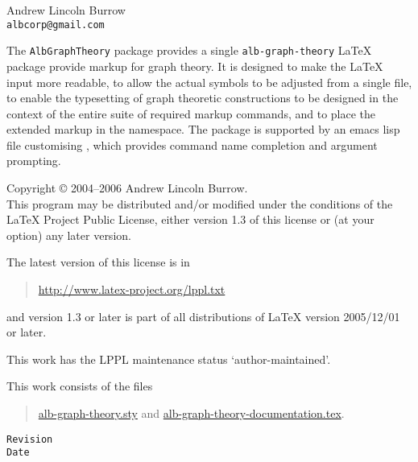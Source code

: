\documentclass[11pt,a4paper,oneside,titlepage]{alb-corp}
\begin{document}


\begin{albTitlePage}


  Andrew Lincoln Burrow\\
  \texttt{albcorp@gmail.com}



  The \texttt{AlbGraphTheory} package provides a single
  \texttt{alb-graph-theory} \LaTeX{} package provide markup for graph
  theory.  It is designed to make the \LaTeX{} input more readable, to
  allow the actual symbols to be adjusted from a single file, to enable
  the typesetting of graph theoretic constructions to be designed in the
  context of the entire suite of required markup commands, and to place
  the extended markup in the \albLogo{} namespace.  The package is
  supported by an emacs lisp file customising \AUCTeX{}, which provides
  command name completion and argument prompting.



  Copyright \copyright{} 2004--2006 Andrew Lincoln Burrow.\\
  This program may be distributed and/or modified under the conditions
  of the \LaTeX{} Project Public License, either version 1.3 of this
  license or (at your option) any later version.

  \medskip{}

  The latest version of this license is in
  \begin{quote}
    \url{http://www.latex-project.org/lppl.txt}
  \end{quote}
  and version 1.3 or later is part of all distributions of LaTeX version
  2005/12/01 or later.

  \medskip{}

  This work has the LPPL maintenance status `author-maintained'.

  \medskip{}

  This work consists of the files
  \begin{quote}
    \begin{flushleft}
      \url{alb-graph-theory.sty} and
      \url{alb-graph-theory-documentation.tex}.
    \end{flushleft}
  \end{quote}



  \verb$Revision$\\
  \verb$Date$

\end{albTitlePage}
\end{document}
